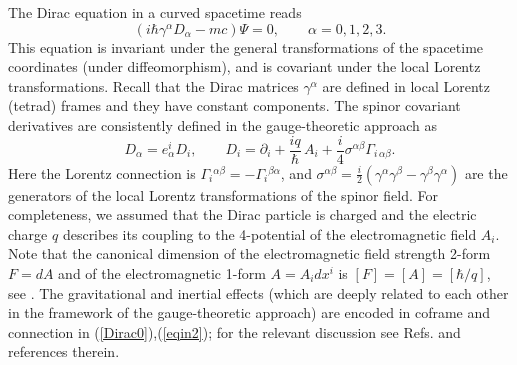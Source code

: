\documentclass[preprint,showpacs,preprintnumbers,eqsecnum,amsmath,amssymb]{revtex4-1}
\begin{document}
The Dirac equation in a curved spacetime reads
\begin{equation}
(i\hbar\gamma^\alpha D_\alpha - mc)\Psi=0,\qquad \alpha=0,1,2,3.
\label{Dirac0}
\end{equation}
This equation is invariant under the general transformations of the spacetime coordinates
(under diffeomorphism), and is covariant under the local Lorentz transformations. Recall
that the Dirac matrices $\gamma^\alpha$ are defined in local Lorentz (tetrad) frames and
they have constant components. The spinor covariant derivatives are consistently defined
in the gauge-theoretic approach \cite{Sciama,Kibble,HonnefH,Reader} as
\begin{equation}
D_\alpha = e_\alpha^i D_i,\qquad D_i = \partial _i + {\frac {iq}{\hbar}}
\,A_i + {\frac i4}\sigma^{\alpha\beta}\Gamma_{i\,\alpha\beta}.\label{eqin2}
\end{equation}
Here the Lorentz connection is $\Gamma_i{}^{\alpha\beta} = - \Gamma_i{}^{\beta\alpha}$, and
$\sigma^{\alpha\beta} = {\frac i2}\left(\gamma^\alpha \gamma^\beta - \gamma^\beta\gamma^\alpha
\right)$ are the generators of the local Lorentz transformations of the spinor field.
For completeness, we assumed that the Dirac particle is charged  and the electric charge
$q$ describes its coupling to the 4-potential of the electromagnetic field $A_i$.
Note that the canonical dimension of the electromagnetic field strength 2-form $F = dA$
and of the electromagnetic 1-form $A = A_idx^i$ is $[F] = [A] = [\hbar/q]$, see \cite{birk}.
The gravitational and inertial effects (which are deeply related to each other in the
framework of the gauge-theoretic approach) are encoded in coframe and connection
in (\ref{Dirac0}),(\ref{eqin2}); for the relevant discussion see Refs. \cite{HN,Ob1,Ob2}
and references therein.
\end{document}
